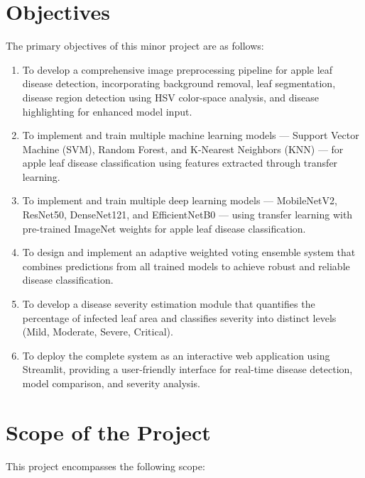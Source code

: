 \documentclass[12pt]{report}
\begin{document}
\section{Objectives}

The primary objectives of this minor project are as follows:

\begin{enumerate}[leftmargin=*]
\item To develop a comprehensive image preprocessing pipeline for apple leaf disease detection, incorporating background removal, leaf segmentation, disease region detection using HSV color-space analysis, and disease highlighting for enhanced model input.

\item To implement and train multiple machine learning models --- Support Vector Machine (SVM), Random Forest, and K-Nearest Neighbors (KNN) --- for apple leaf disease classification using features extracted through transfer learning.

\item To implement and train multiple deep learning models --- MobileNetV2, ResNet50, DenseNet121, and EfficientNetB0 --- using transfer learning with pre-trained ImageNet weights for apple leaf disease classification.

\item To design and implement an adaptive weighted voting ensemble system that combines predictions from all trained models to achieve robust and reliable disease classification.

\item To develop a disease severity estimation module that quantifies the percentage of infected leaf area and classifies severity into distinct levels (Mild, Moderate, Severe, Critical).

\item To deploy the complete system as an interactive web application using Streamlit, providing a user-friendly interface for real-time disease detection, model comparison, and severity analysis.
\end{enumerate}

\section{Scope of the Project}

This project encompasses the following scope:
\end{document}
